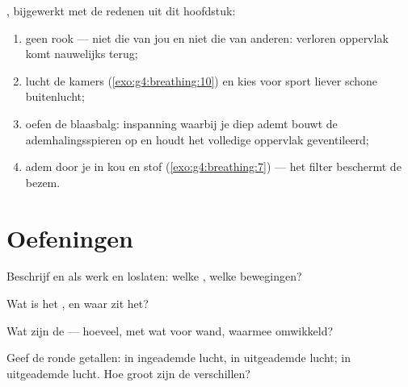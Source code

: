 \begin{method}\label{met:g7:lungs-and-gas-exchange:keep}
, bijgewerkt met de redenen uit dit
hoofdstuk:
\begin{enumerate}
  \item geen rook --- niet die van jou en niet die van anderen: verloren
        oppervlak komt nauwelijks terug;
  \item lucht de kamers (\cref{exo:g4:breathing:10}) en kies voor sport
        liever schone buitenlucht;
  \item oefen de blaasbalg: inspanning waarbij je diep ademt bouwt de
        ademhalingsspieren op en houdt het volledige oppervlak
        geventileerd;
  \item adem door je  in kou en stof
        (\cref{exo:g4:breathing:7}) --- het filter beschermt de bezem.
\end{enumerate}
\end{method}

\section{Oefeningen}

\begin{exercise}[$\star$]\label{exo:g7:lungs-and-gas-exchange:1}
Beschrijf  en  als werk en loslaten: welke , welke
bewegingen?
\end{exercise}

\begin{exercise}[$\star$]\label{exo:g7:lungs-and-gas-exchange:2}
Wat is het , en waar zit het?
\end{exercise}

\begin{exercise}[$\star$]\label{exo:g7:lungs-and-gas-exchange:3}
Wat zijn de  --- hoeveel, met wat voor wand, waarmee
omwikkeld?
\end{exercise}

\begin{exercise}[$\star$]\label{exo:g7:lungs-and-gas-exchange:4}
Geef de ronde getallen:  in ingeademde lucht, in uitgeademde
lucht;  in uitgeademde lucht. Hoe groot zijn de verschillen?
\end{exercise}

